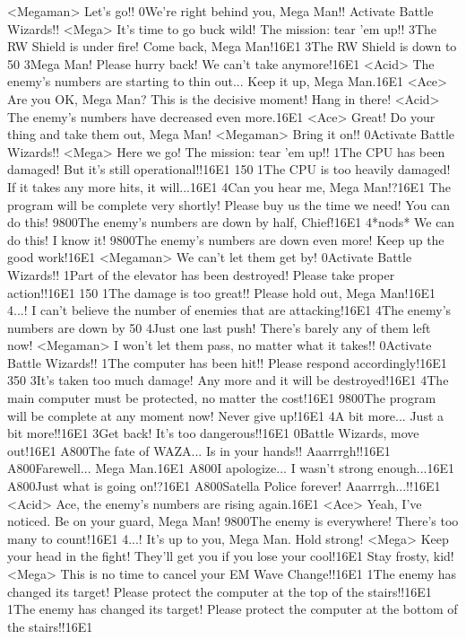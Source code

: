 <Megaman> Let's go!! 
0We're right behind you, Mega Man!! 
Activate Battle Wizards!! 
<Mega> It's time to go buck wild! 
The mission: tear 'em up!! 
3The RW Shield is under fire! Come back, Mega Man!{16}{E1} 
3The RW Shield is down to 50%
3Mega Man! Please hurry back! We can't take anymore!{16}{E1} 
<Acid> The enemy's numbers are starting to thin out... 
Keep it up, Mega Man.{16}{E1} 
<Ace> Are you OK, Mega Man? 
This is the decisive moment! Hang in there! 
<Acid> The enemy's numbers have decreased even more.{16}{E1} 
<Ace> Great! Do your thing and take them out, Mega Man! 
<Megaman> Bring it on!! 
0Activate Battle Wizards!! 
<Mega> Here we go! 
The mission: tear 'em up!! 
1The CPU has been damaged! But it's still operational!!{16}{E1} 
150%
1The CPU is too heavily damaged! If it takes any more hits, it will...{16}{E1} 
4Can you hear me, Mega Man!?{16}{E1} 
The program will be complete very shortly! 
Please buy us the time we need! You can do this! 
{98}{00}The enemy's numbers are down by half, Chief!{16}{E1} 
4*nods* We can do this! I know it! 
{98}{00}The enemy's numbers are down even more! Keep up the good work!{16}{E1} 
<Megaman> We can't let them get by! 
0Activate Battle Wizards!! 
1Part of the elevator has been destroyed! Please take proper action!!{16}{E1} 
150%
1The damage is too great!! Please hold out, Mega Man!{16}{E1} 
4...! I can't believe the number of enemies that are attacking!{16}{E1} 
4The enemy's numbers are down by 50%
4Just one last push! There's barely any of them left now! 
<Megaman> I won't let them pass, no matter what it takes!! 
0Activate Battle Wizards!! 
1The computer has been hit!! Please respond accordingly!{16}{E1} 
350%
3It's taken too much damage! Any more and it will be destroyed!{16}{E1} 
4The main computer must be protected, no matter the cost!{16}{E1} 
{98}{00}The program will be complete at any moment now! Never give up!{16}{E1} 
4A bit more... Just a bit more!!{16}{E1} 
3Get back! It's too dangerous!!{16}{E1} 
0Battle Wizards, move out!{16}{E1} 
{A8}{00}The fate of WAZA... Is in your hands!! Aaarrrgh!!{16}{E1} 
{A8}{00}Farewell... Mega Man.{16}{E1} 
{A8}{00}I apologize... I wasn't strong enough...{16}{E1} 
{A8}{00}Just what is going on!?{16}{E1} 
{A8}{00}Satella Police forever! Aaarrrgh...!!{16}{E1} 
<Acid> Ace, the enemy's numbers are rising again.{16}{E1} 
<Ace> Yeah, I've noticed. Be on your guard, Mega Man! 
{98}{00}The enemy is everywhere! There's too many to count!{16}{E1} 
4...! It's up to you, Mega Man. Hold strong! 
<Mega> Keep your head in the fight! They'll get you if you lose your cool!{16}{E1} Stay frosty, kid! 
<Mega> This is no time to cancel your EM Wave Change!!{16}{E1} 
1The enemy has changed its target! 
Please protect the computer at the top of the stairs!!{16}{E1} 
1The enemy has changed its target! 
Please protect the computer at the bottom of the stairs!!{16}{E1} 
